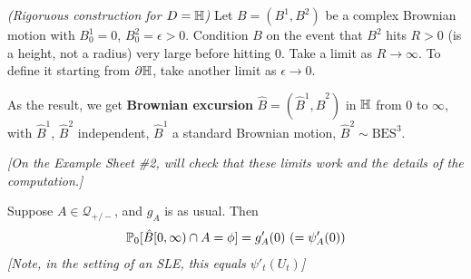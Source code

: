 \documentclass[12pt,a4paper]{article}
\begin{document}
 \emph{(Rigoruous construction for $D= \mathbb{H}$)} Let $B= (B^1, B^2)$ be a complex Brownian motion with $B^1_0 =0$, $B^2_0 =\epsilon >0$. Condition $B$ on the event that $B^2$ hits $R>0$ (is a height, not a radius) very large before hitting 0. Take a limit as $R\rightarrow \infty$. To define it starting from $\partial \mathbb{H}$, take another limit as $\epsilon \rightarrow 0$.

\quad As the result, we get \textbf{Brownian excursion} $\hat{B} = (\hat{B}^1, \hat{B}^2)$ in $\mathbb{H}$ from $0$ to $\infty$, with $\hat{B}^1$, $\hat{B}^2$ independent, $\hat{B}^1$ a standard Brownian motion, $\hat{B}^2 \sim \text{BES}^3$.

\emph{[On the Example Sheet \#2, will check that these limits work and the details of the computation.]}
\s

\prop Suppose $A\in \mathscr{Q}_{+/-}$, and $g_A$ is as usual. Then
\begin{align*}
\mathbb{P}_0 [\hat{B}[0, \infty) \cap A = \phi] = g'_A(0) \,\, (=\psi'_A(0))
\end{align*}
\emph{[Note, in the setting of an SLE, this equals $\psi'_t(U_t)$]}
\end{document}

